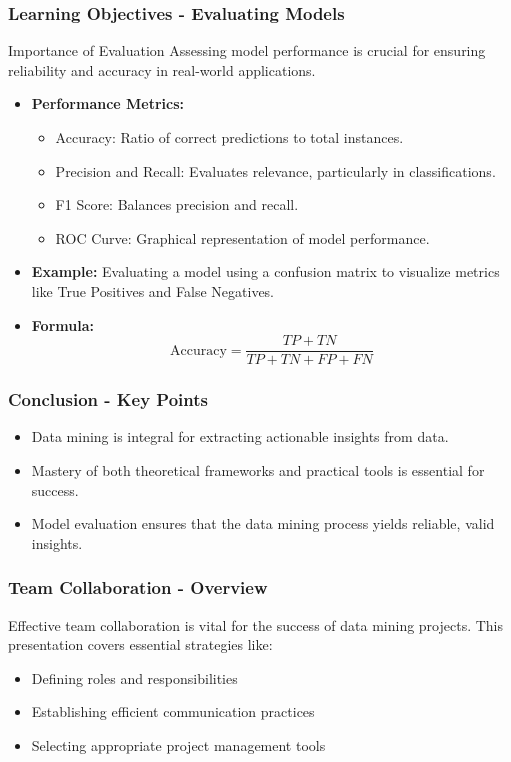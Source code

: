 \documentclass[aspectratio=169]{beamer}
\begin{document}
\begin{frame}[fragile]
    \frametitle{Learning Objectives - Evaluating Models}
    \begin{block}{Importance of Evaluation}
        Assessing model performance is crucial for ensuring reliability and accuracy in real-world applications.
    \end{block}
    \begin{itemize}
        \item \textbf{Performance Metrics:}
            \begin{itemize}
                \item Accuracy: Ratio of correct predictions to total instances.
                \item Precision and Recall: Evaluates relevance, particularly in classifications.
                \item F1 Score: Balances precision and recall.
                \item ROC Curve: Graphical representation of model performance.
            \end{itemize}
        \item \textbf{Example:} 
            Evaluating a model using a confusion matrix to visualize metrics like True Positives and False Negatives.
        \item \textbf{Formula:}
            \[
            \text{Accuracy} = \frac{TP + TN}{TP + TN + FP + FN}
            \]
    \end{itemize}
\end{frame}

\begin{frame}[fragile]
    \frametitle{Conclusion - Key Points}
    \begin{itemize}
        \item Data mining is integral for extracting actionable insights from data.
        \item Mastery of both theoretical frameworks and practical tools is essential for success.
        \item Model evaluation ensures that the data mining process yields reliable, valid insights.
    \end{itemize}
\end{frame}

\begin{frame}[fragile]
    \frametitle{Team Collaboration - Overview}
    Effective team collaboration is vital for the success of data mining projects. 
    This presentation covers essential strategies like:
    \begin{itemize}
        \item Defining roles and responsibilities
        \item Establishing efficient communication practices
        \item Selecting appropriate project management tools
    \end{itemize}
\end{frame}
\end{document}
